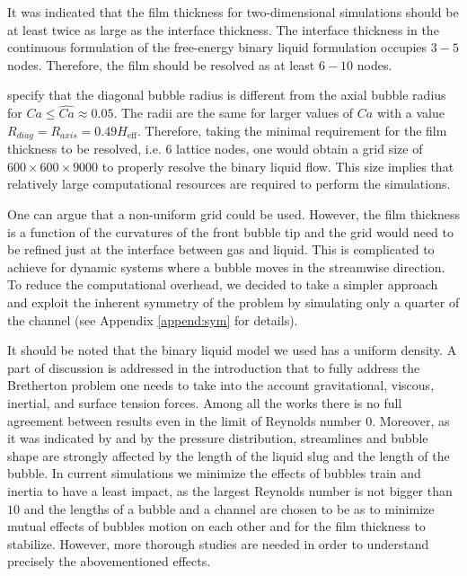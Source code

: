 \documentclass{article}
\begin{document}
It was indicated \cite{kuzmin-binary2d} that the film thickness for two-dimensional simulations should be at least twice as large
as the interface thickness. The interface thickness in the continuous formulation of the
free-energy binary liquid formulation occupies $3-5$ nodes. Therefore, the film should be
resolved as at least $6-10$ nodes. 

\citet{heil-threedim} specify that the diagonal bubble radius is different from the
axial bubble radius for $Ca\leq \widehat{Ca}\approx 0.05$. The radii are the same for larger values
of
$Ca$ with a value $R_{diag}=R_{axis}=0.49 H_{\mathrm{eff}}$. Therefore, taking the minimal
requirement for the film thickness to be
resolved, i.e. $6$ lattice nodes, one would obtain a grid size of $600\times 600 \times 9000 $ to
properly resolve the binary liquid flow. This size implies that relatively
large
computational resources are required to perform the simulations.

One can argue that a non-uniform grid could be used. However, the film thickness is a
function of the curvatures of the front bubble tip \cite{bretherton} and the grid would need to
be refined just at the interface between gas and liquid. This is complicated to achieve for
dynamic systems where a bubble moves in the streamwise direction.
To reduce the computational overhead, we decided to take a simpler approach and exploit the
inherent symmetry of the problem by simulating only a quarter of the channel (see Appendix
\ref{append:sym} for details).

It should be noted that the binary liquid model we used has a uniform density. A part of discussion is
addressed in the introduction that to fully address the Bretherton problem one needs to take into
the account gravitational, viscous, inertial, and surface tension forces. Among all the works there
is no full 
agreement between results even in the limit of Reynolds number $0$.  Moreover, as it was indicated
by \citet{kreutzer-taylor} and by \citet{cerro-bubble-train} the pressure distribution, streamlines
and bubble shape are strongly affected by the length of the liquid slug and the length of the
bubble. In current simulations we minimize the effects of bubbles train and inertia to have a least
impact, as the largest Reynolds number is not bigger than $10$ and the lengths of a bubble and a
channel are chosen to be as to minimize mutual effects of bubbles motion on each other and for the
film thickness to stabilize. However, more thorough studies are needed in order to understand
precisely the abovementioned effects.
\end{document}
